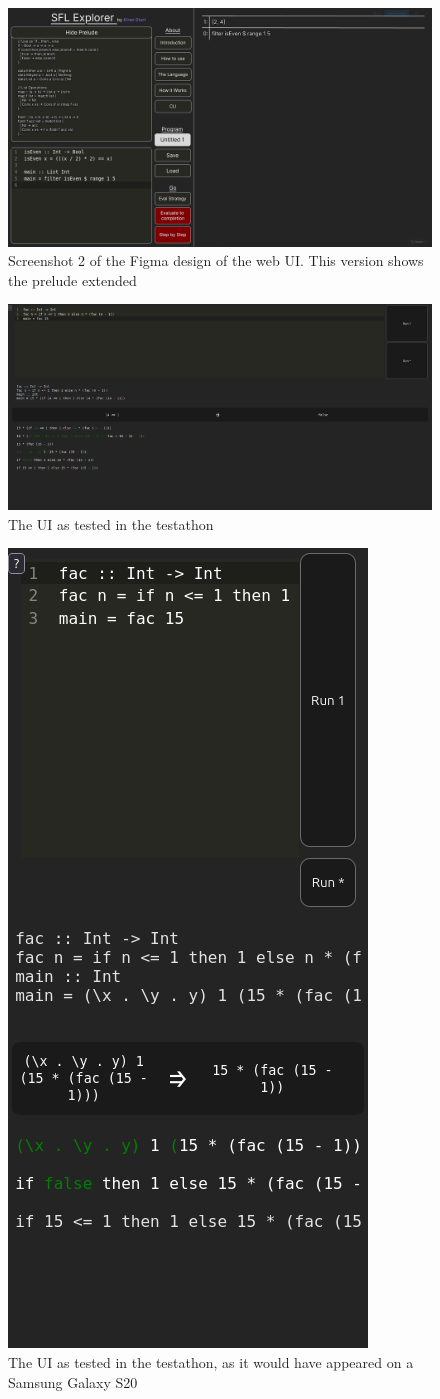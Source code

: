 \begin{figure}[h]
    \centering
    \includegraphics[width=1\linewidth]{images/figma_2.png}
    \captionsetup{justification=centering}
    \caption{Screenshot 2 of the Figma design of the web UI. This version shows the prelude extended}
    \label{fig:screenshot_figma2}
\end{figure}

\begin{figure}[h]
    \centering
    \includegraphics[width=1\linewidth]{images/product_at_testathon.png} 
    \captionsetup{justification=centering}
    \caption{The UI as tested in the testathon}
    \label{fig:screenshot_testathon}
\end{figure}

\begin{figure}[h]
    \centering
    \includegraphics[width=0.3\linewidth]{images/testathon-mobile.png}
    \caption{The UI as tested in the testathon, as it would have appeared on a Samsung Galaxy S20}
    \label{fig:screenshot_testathon_mobile}
\end{figure}

